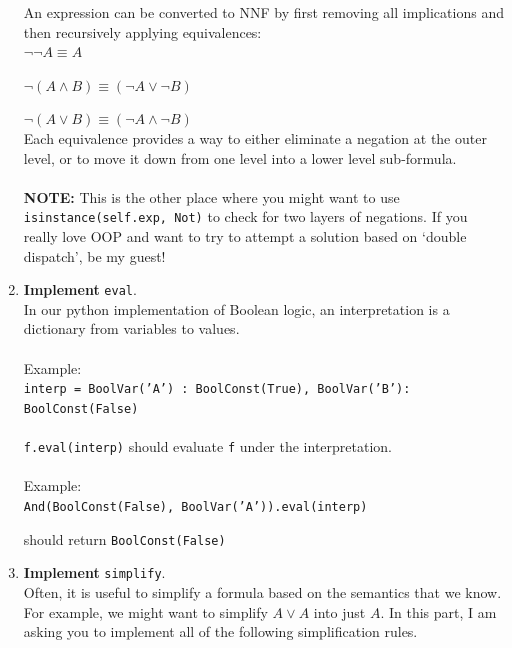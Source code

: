 \documentclass[12pt]{article}
\newenvironment{problem}[2][Problem]{\begin{trivlist}
\item[\hskip \labelsep {\bfseries #1}\hskip \labelsep {\bfseries #2.}]}{\end{trivlist}}
\begin{document}
\begin{problem}{2}
\begin{enumerate}[label=\Alph*.]
An expression can be converted to NNF by first removing all implications and then recursively applying equivalences: \\

$\neg \neg A \equiv A$

$\neg (A \land B) \equiv (\neg A \lor \neg B)$

$\neg (A \lor B) \equiv (\neg A \land \neg B)$ \\


Each equivalence provides a way to either eliminate a negation at the outer level, or to move it down from one level into a lower level sub-formula. \\ \\

\textbf{NOTE:} This is the other place where you might want to use \texttt{isinstance(self.exp, Not)} to check for two layers of negations. If you really love OOP and want to try to attempt a solution based on `double dispatch', be my guest!

\item \textbf{Implement} \texttt{eval}. \\



In our python implementation of Boolean logic, an interpretation is a dictionary from variables to values. \\ \\

Example:  \\

\texttt{interp = {BoolVar('A') : BoolConst(True), BoolVar('B'): BoolConst(False)}} \\ \\

\texttt{f.eval(interp)} should evaluate \texttt{f} under the interpretation. \\ \\

Example: \\

\texttt{And(BoolConst(False), BoolVar('A')).eval(interp)} 

should return \texttt{BoolConst(False)}


\newpage

\item \textbf{Implement} \texttt{simplify}. \\

Often, it is useful to simplify a formula based on the semantics that we know. For example, we might want to simplify $A \lor A$ into just $A$. In this part, I am asking you to implement all of the following simplification rules.



\end{enumerate}
\end{problem}
\end{document}
